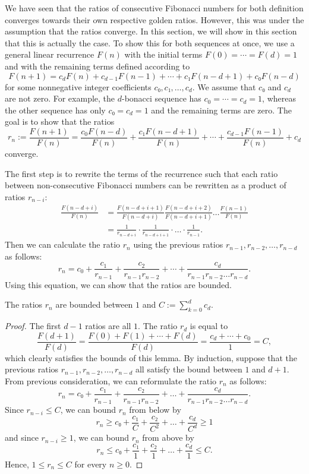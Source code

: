 We have seen that the ratios of consecutive Fibonacci numbers for both
definition converges towards their own respective golden ratios.
However, this was under the assumption that the ratios converge.
In this section, we will show in this section that this is actually the case.
To show this for both sequences at once, we use a general linear recurrence $F(n)$
with the initial terms $F(0) = ⋯ = F(d) = 1$ and with the remaining terms
defined according to
\[
  F(n + 1) = c_d F(n) + c_{d-1} F(n-1) + ⋯ + c₁ F(n - d + 1) + c₀ F(n - d)
\]
for some nonnegative integer coefficients $c₀, c₁, …, c_d$.
We assume that $c₀$ and $c_d$ are not zero.
For example, the $d$-bonacci sequence has $c_0 = ⋯ = c_d = 1$,
whereas the other sequence has only $c₀ = c_d = 1$ and the remaining terms are zero.
The goal is to show that the ratios
\[
  r_n
  := \frac{F(n+1)}{F(n)}
  = \frac{c_0 F(n - d)}{F(n)} + \frac{c₁ F(n - d + 1)}{F(n)} + ⋯ + \frac{c_{d-1} F(n-1)}{F(n)} + c_d
\]
converge.

The first step is to rewrite the terms of the recurrence such that each ratio
between non-consecutive Fibonacci numbers can be rewritten as a product of
ratios $r_{n-i}$:
\begin{align*}
  \frac{F(n - d + i)}{F(n)}
  & = \frac{F(n - d + i + 1)}{F(n - d + i)} \frac{F(n - d + i + 2)}{F(n - d + i + 1)} \dots \frac{F(n-1)}{F(n)} \\
  & = \frac{1}{r_{n - d + i}} · \frac{1}{r_{n - d + i + 1}} · \dots · \frac{1}{r_{n-1}}.
\end{align*}
Then we can calculate the ratio $r_n$ using the previous ratios $r_{n-1}, r_{n-2}, …, r_{n-d}$ as follows:
\[
  r_n = c_0 + \frac{c_1}{r_{n-1}} + \frac{c_2}{r_{n-1} r_{n-2}} + ⋯ + \frac{c_d}{r_{n-1} r_{n-2} \dots r_{n-d}}.
\]
Using this equation, we can show that the ratios are bounded.

\begin{lemma}
  \label{lem:fib-bounded}
  The ratios $r_n$ are bounded between $1$ and $C := ∑_{k=0}^d c_d$.
\end{lemma}

\begin{proof}
  The first $d - 1$ ratios are all $1$.
  The ratio $r_d$ is equal to
  \[
    \frac{F(d+1)}{F(d)} = \frac{F(0) + F(1) + ⋯ + F(d)}{F(d)} = \frac{c_d + ⋯ + c_0}{1} = C,
  \]
  which clearly satisfies the bounds of this lemma.
  By induction, suppose that the previous ratios $r_{n-1}, r_{n-2}, …, r_{n-d}$
  all satisfy the bound between $1$ and $d+1$.
  From previous consideration, we can reformulate the ratio $r_n$ as follows:
  \[
    r_n = c₀ + \frac{c₁}{r_{n-1}} + \frac{c₂}{r_{n-1} r_{n-2}} + \dots + \frac{c_d}{r_{n-1} r_{n-2} \dots r_{n-d}}.
  \]
  Since $r_{n-i} ≤ C$, we can bound $r_n$ from below by
  \[
    r_n ≥ c₀ + \frac{c₁}{C} + \frac{c₂}{C^2} + \dots + \frac{c_d}{C^d} ≥ 1
  \]
  and since $r_{n-i} ≥ 1$, we can bound $r_n$ from above by
  \[
    r_n ≤ c₀ + \frac{c₁}{1} + \frac{c₂}{1} + \dots + \frac{c_d}{1} ≤ C.
  \]
  Hence, $1 ≤ r_n ≤ C$ for every $n ≥ 0$.
\end{proof}

